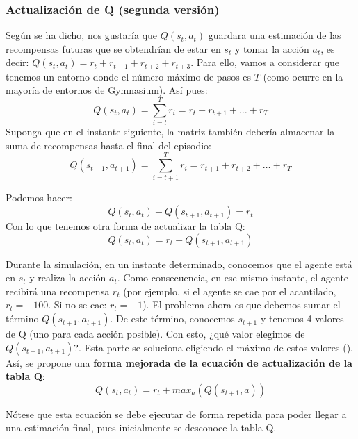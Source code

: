 \documentclass{article}
\begin{document}
\begin{itemize}
\subsubsection{Actualización de Q (segunda versión)}
Según se ha dicho, nos gustaría que $Q(s_t,a_t)$ guardara una estimación de las recompensas futuras que se obtendrían de estar en $s_t$ y tomar la acción $a_t$, es decir:
$Q(s_t,a_t)=r_t + r_{t+1} + r_{t+2} + r_{t+3}$. Para ello, vamos a considerar que tenemos un entorno donde el número máximo de pasos es $T$ (como ocurre en la mayoría de entornos de Gymnasium). Así pues:
\begin{equation}
Q(s_t,a_t) = \sum_{i=t}^{T} r_i= r_t +  r_{t+1}+ \ldots + r_T
\end{equation}
Suponga que en el instante siguiente, la matriz también debería almacenar la suma de recompensas hasta el final del episodio:
\begin{equation}
Q(s_{t+1},a_{t+1}) = \sum_{i=t+1}^{T} r_i = r_{t+1} +r_{t+2} + \ldots + r_T     
\end{equation}

Podemos hacer: 
\begin{equation}
    Q(s_t,a_t) - Q(s_{t+1},a_{t+1}) = r_t
\end{equation}
Con lo que tenemos otra forma de actualizar la tabla Q:
\begin{equation*}
Q(s_t,a_t) = r_t + Q(s_{t+1},a_{t+1})   
\end{equation*}

Durante la simulación, en un instante determinado, conocemos que el agente está en $s_t$ y realiza la acción $a_t$. Como consecuencia, en ese mismo instante, el agente recibirá una recompensa $r_t$ (por ejemplo, si el agente se cae por el acantilado, $r_t=-100$. Si no se cae: $r_t=-1$). El problema ahora es que debemos sumar el término $Q(s_{t+1},a_{t+1})$. De este término, conocemos $s_{t+1}$ y tenemos 4 valores de Q (uno para cada acción posible). Con esto, ¿qué valor elegimos de $Q(s_{t+1},a_{t+1})$?. Esta parte se soluciona eligiendo el máximo de estos valores (). Así, se propone una \textbf{forma mejorada de la ecuación de actualización de la tabla Q}:
\begin{equation*}
Q(s_t,a_t) = r_t + max_a(Q(s_{t+1},a))
\end{equation*}

Nótese que esta ecuación se debe ejecutar de forma repetida para poder llegar a una estimación final, pues inicialmente se desconoce la tabla Q. 


\end{itemize}
\end{document}
